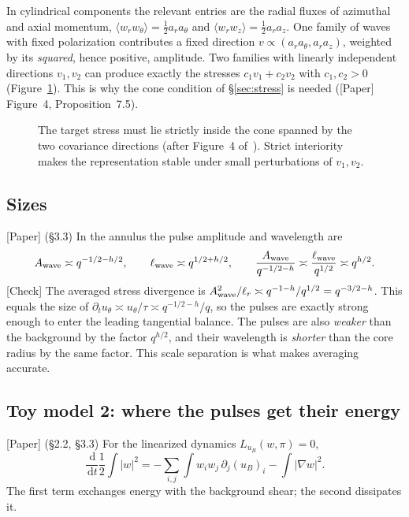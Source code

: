 \documentclass[11pt]{article}
\newcommand{\dd}{\,\mathrm{d}}
\newcommand{\avg}[1]{\langle #1\rangle}
\theoremstyle{plain}
\theoremstyle{remark}
\newcommand{\paper}{\textsf{\small[Paper]}}
\newcommand{\chk}{\textsf{\small[Check]}}
\begin{document}
In cylindrical components the relevant entries are the radial fluxes of azimuthal and axial momentum, $\avg{w_rw_\theta}=\tfrac12a_ra_\theta$ and $\avg{w_rw_z}=\tfrac12a_ra_z$. One family of waves with fixed polarization contributes a fixed direction $v\propto(a_ra_\theta,a_ra_z)$, weighted by its \emph{squared}, hence positive, amplitude. Two families with linearly independent directions $v_1,v_2$ can produce exactly the stresses $c_1v_1+c_2v_2$ with $c_1,c_2>0$ (Figure~\ref{fig:cone}). This is why the cone condition of \S\ref{sec:stress} is needed (\paper{} Figure~4, Proposition~7.5).

\begin{figure}[h]
\centering
{}
\caption{The target stress must lie strictly inside the cone spanned by the two covariance directions (after Figure~4 of~\cite{OAI}). Strict interiority makes the representation stable under small perturbations of $v_1,v_2$.}
\label{fig:cone}
\end{figure}

\subsection{Sizes}
\paper{} (\S3.3) In the annulus the pulse amplitude and wavelength are
\[
A_{\rm wave}\asymp q^{-1/2-h/2},\qquad \ell_{\rm wave}\asymp q^{1/2+h/2},\qquad \frac{A_{\rm wave}}{q^{-1/2-h}}\asymp\frac{\ell_{\rm wave}}{q^{1/2}}\asymp q^{h/2}.
\]
\chk{} The averaged stress divergence is $A_{\rm wave}^2/\ell_r\asymp q^{-1-h}/q^{1/2}=q^{-3/2-h}$. This equals the size of $\partial_tu_\theta\asymp u_\theta/\tau\asymp q^{-1/2-h}/q$, so the pulses are exactly strong enough to enter the leading tangential balance. The pulses are also \emph{weaker} than the background by the factor $q^{h/2}$, and their wavelength is \emph{shorter} than the core radius by the same factor. This scale separation is what makes averaging accurate.

\subsection{Toy model 2: where the pulses get their energy}
\paper{} (\S2.2, \S3.3) For the linearized dynamics $L_{u_B}(w,\pi)=0$,
\[
\frac{\dd}{\dd t}\frac12\int|w|^2=-\sum_{i,j}\int w_iw_j\,\partial_j(u_B)_i-\int|\nabla w|^2 .
\]
The first term exchanges energy with the background shear; the second dissipates it.
\end{document}
